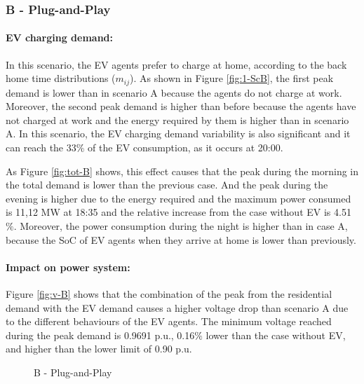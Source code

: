 \documentclass[a4paper,11pt,twoside,openright]{report}
\begin{document}
\subsubsection{B - Plug-and-Play}

\paragraph{EV charging demand:}
In this scenario, the EV agents prefer to charge at home, according to the back home time distributions ($m_{ij}$). As shown in Figure \ref{fig:1-ScB}, the first peak demand is lower than in scenario A because the agents do not charge at work. Moreover, the second peak demand is higher than before because the agents have not charged at work and the energy required by them is higher than in scenario A. In this scenario, the EV charging demand variability is also significant and it can reach the 33$\%$ of the EV consumption, as it occurs at 20:00.

As Figure \ref{fig:tot-B} shows, this effect causes that the peak during the morning in the total demand is lower than the previous case. And the peak during the evening is higher due to the energy required and the maximum power consumed is 11,12 MW at 18:35 and the relative increase from the case without EV is 4.51$\%$. Moreover, the power consumption during the night is higher than in case A, because the SoC of EV agents when they arrive at home is lower than previously.

\paragraph{Impact on power system:}
Figure \ref{fig:v-B} shows that the combination of the peak from the residential demand with the EV demand causes a higher voltage drop than scenario A due to the different behaviours of the EV agents. The minimum voltage reached during the peak demand is 0.9691 p.u., 0.16$\%$ lower than the case without EV, and higher than the lower limit of 0.90 p.u.

\begin{figure}[htbp]
	\centering
	\caption{B - Plug-and-Play}
\end{figure}
\end{document}
